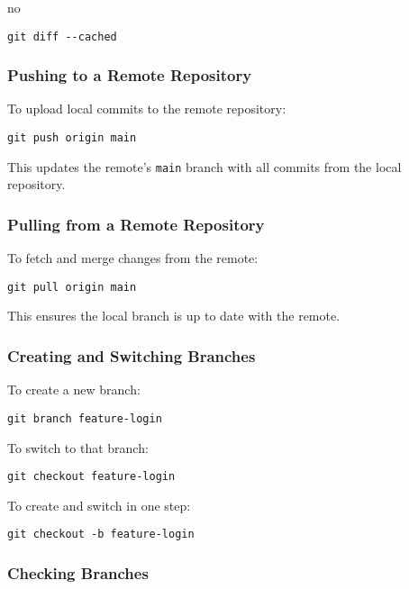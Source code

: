 no\documentclass{article}
\begin{document}
\begin{verbatim}
git diff --cached
\end{verbatim}

\subsubsection{Pushing to a Remote Repository}

To upload local commits to the remote repository:

\begin{verbatim}
git push origin main
\end{verbatim}

\noindent This updates the remote’s \texttt{main} branch with all commits from the local repository.

\subsubsection{Pulling from a Remote Repository}

To fetch and merge changes from the remote:

\begin{verbatim}
git pull origin main
\end{verbatim}

\noindent This ensures the local branch is up to date with the remote.

\subsubsection{Creating and Switching Branches}

To create a new branch:

\begin{verbatim}
git branch feature-login
\end{verbatim}

\noindent To switch to that branch:

\begin{verbatim}
git checkout feature-login
\end{verbatim}

\noindent To create and switch in one step:

\begin{verbatim}
git checkout -b feature-login
\end{verbatim}

\subsubsection{Checking Branches}
\end{document}
